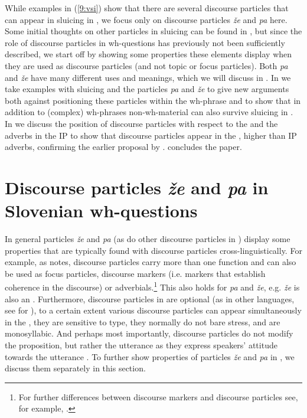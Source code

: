 \documentclass[output=paper,modfonts,newtxmath,hidelinks]{langscibook}
\begin{document}
\noindent While examples in (\ref{9:vsi}) show that there are several discourse particles that can appear in sluicing in , we focus only on discourse particles \textit{že} and \textit{pa} here. Some initial thoughts on other particles in sluicing can be found in \cite{marusicetal2015}, but since the role of  discourse particles in wh-questions has previously not been sufficiently described, we start off by showing some properties these elements display when they are used as discourse particles (and not topic or focus particles). Both \textit{pa} and \textit{že} have many different uses and meanings, which we will discuss in . In  we take examples with sluicing and the particles \textit{pa} and \textit{že} to give new arguments both against positioning these particles within the wh-phrase and to show that in addition to (complex) wh-phrases non-wh-material can also survive sluicing in . In  we discuss the position of discourse particles with respect to the   and the adverbs in the IP to show that discourse particles appear in the , higher than IP adverbs, confirming the earlier proposal by \cite{marusicetal2015}.  concludes the paper.


\section{Discourse particles \textit{že} and \textit{pa} in Slovenian wh-questions}\label{9:s2}

In general particles \textit{že} and \textit{pa} (as do other discourse particles in ) display some properties that are typically found with discourse particles cross-lingui\-sti\-cal\-ly. For example, as \cite{zimmermann2011} notes, discourse particles carry more than one function and can also be used as focus particles, discourse markers (i.e. markers that establish coherence in the discourse) or adverbials.\footnote{For further differences between discourse markers and discourse particles see, for example, \cite{zimmermann2011}.} This also holds for \textit{pa} and \textit{že}, e.g. \textit{že} is also an  . Furthermore, discourse particles in  are optional (as in other languages, see \citealt{bayerobenauer2011} for ), to a certain extent various discourse particles can appear simultaneously in the , they are sensitive to  type, they normally do not bare stress, and are monosyllabic. And perhaps most importantly, discourse particles do not modify the proposition, but rather the utterance \citep{bayerobenauer2011} as they express speakers' attitude towards the utterance \citep{zimmermann2011}. To further show properties of particles \textit{že} and \textit{pa} in , we discuss them separately in this section. 
\end{document}
